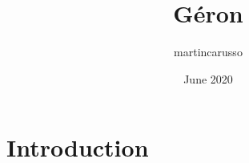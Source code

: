 \documentclass{article}
\title{Géron}
\author{martincarusso }
\date{June 2020}
\begin{document}
\maketitle

\section{Introduction}
\end{document}
